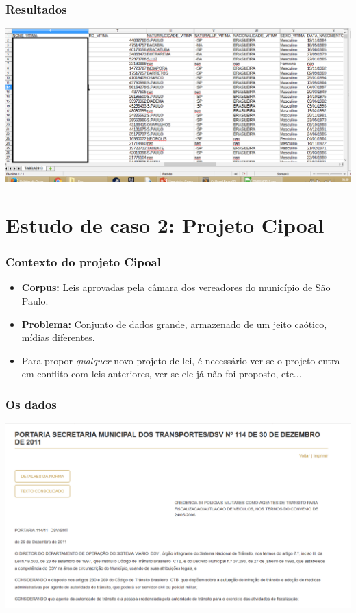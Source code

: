 \documentclass[11pt]{beamer}
\begin{document}
\begin{frame}
\frametitle{Resultados}
\includegraphics[width=\columnwidth,height=\textheight,keepaspectratio]{bo-excel.png}
\end{frame}

\section{Estudo de caso 2: Projeto Cipoal}
\begin{frame}
\frametitle{Contexto do projeto Cipoal}
\begin{itemize}
	\item \textbf{Corpus: }Leis aprovadas pela câmara dos vereadores do município de São Paulo.\\
	\item \textbf{Problema: }Conjunto de dados grande, armazenado de um jeito caótico, mídias diferentes.\\
	\item Para propor \textit{qualquer} novo projeto de lei, é necessário ver se o projeto entra em conflito com leis anteriores, ver se ele já não foi proposto, etc...\\
\end{itemize}
\end{frame}
\begin{frame}
\frametitle{Os dados}
\includegraphics[width=\columnwidth,height=\textheight,keepaspectratio]{Lei_site.png}
\end{frame}
\end{document}
